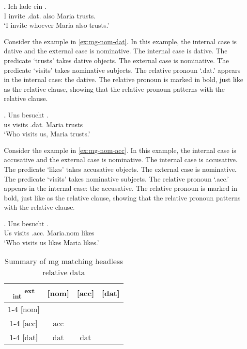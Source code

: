 \exg. Ich {lade ein}    . \\
 I invite\scsub{[acc]} .\ac{dat}. also Maria trusts\scsub{[dat]}.\\
 `I invite whoever Maria also trusts.' \label{ex:mg-acc-dat}

Consider the example in \ref{ex:mg-nom-dat}. In this example, the internal case is dative and the external case is nominative.
The internal case is dative. The predicate  `trusts' takes dative objects.
The external case is nominative. The predicate  `visits' takes nominative subjects.
The relative pronoun  `.\ac{dat}.' appears in the internal case: the dative. The relative pronoun is marked in bold, just like as the relative clause, showing that the relative pronoun patterns with the relative clause.

\exg. Uns besucht   .\\
 us visits\scsub{[nom]} .\ac{dat}. Maria trusts\scsub{[dat]}\\
 `Who visits us, Maria trusts.' \label{ex:mg-nom-dat}

 Consider the example in \ref{ex:mg-nom-acc}. In this example, the internal case is accusative and the external case is nominative.
 The internal case is accusative. The predicate  `likes' takes accusative objects.
 The external case is nominative. The predicate  `visits' takes nominative subjects.
 The relative pronoun  `.\ac{acc}.' appears in the internal case: the accusative. The relative pronoun is marked in bold, just like as the relative clause, showing that the relative pronoun patterns with the relative clause.

 \exg. Uns besucht   .\\
  Us visits\scsub{[nom]} .\ac{acc}. Maria.\ac{nom} likes\scsub{[acc]}\\
  `Who visits us likes Maria likes.' \label{ex:mg-nom-acc}


 \begin{table}[H]
   \center
   \caption {Summary of \ac{mg} matching headless relative data}
 		\begin{tabular}{c|c|c|c}
 		  \toprule
 			\textsubscript{\ac{int}} \textsuperscript{\ac{ext}}
 		        & [\ac{nom}]
 		        & [\ac{acc}]
 		        & [\ac{dat}]
 		        \\ \cmidrule{1-4}
 		    [\ac{nom}]
 		        &
 		        &
 		        &
 		        \\ \cmidrule{1-4}
 		    [\ac{acc}]
 		        & \ac{acc}
 		        &
 		        &
 		        \\ \cmidrule{1-4}
 		    [\ac{dat}]
 		        & \ac{dat}
 		        & \ac{dat}
 		        &
 		        \\
 		  \bottomrule
 		\end{tabular}
 \end{table}


